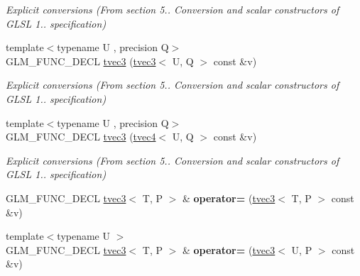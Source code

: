 \begin{DoxyCompactItemize}
\begin{DoxyCompactList}\small\item\em Explicit conversions (From section 5.. Conversion and scalar constructors of G\+L\+SL 1.. specification) \end{DoxyCompactList}\item 
{\footnotesize template$<$typename U , precision Q$>$ }\\G\+L\+M\+\_\+\+F\+U\+N\+C\+\_\+\+D\+E\+CL \hyperlink{structglm_1_1detail_1_1tvec3_a54b078bacee2ec2449d2739d98f20ca4}{tvec3} (\hyperlink{structglm_1_1detail_1_1tvec3}{tvec3}$<$ U, Q $>$ const \&v)\hypertarget{structglm_1_1detail_1_1tvec3_a54b078bacee2ec2449d2739d98f20ca4}{}\label{structglm_1_1detail_1_1tvec3_a54b078bacee2ec2449d2739d98f20ca4}

\begin{DoxyCompactList}\small\item\em Explicit conversions (From section 5.. Conversion and scalar constructors of G\+L\+SL 1.. specification) \end{DoxyCompactList}\item 
{\footnotesize template$<$typename U , precision Q$>$ }\\G\+L\+M\+\_\+\+F\+U\+N\+C\+\_\+\+D\+E\+CL \hyperlink{structglm_1_1detail_1_1tvec3_aee034f5d37843761ab03ce2c279a0435}{tvec3} (\hyperlink{structglm_1_1detail_1_1tvec4}{tvec4}$<$ U, Q $>$ const \&v)\hypertarget{structglm_1_1detail_1_1tvec3_aee034f5d37843761ab03ce2c279a0435}{}\label{structglm_1_1detail_1_1tvec3_aee034f5d37843761ab03ce2c279a0435}

\begin{DoxyCompactList}\small\item\em Explicit conversions (From section 5.. Conversion and scalar constructors of G\+L\+SL 1.. specification) \end{DoxyCompactList}\item 
G\+L\+M\+\_\+\+F\+U\+N\+C\+\_\+\+D\+E\+CL \hyperlink{structglm_1_1detail_1_1tvec3}{tvec3}$<$ T, P $>$ \& {\bfseries operator=} (\hyperlink{structglm_1_1detail_1_1tvec3}{tvec3}$<$ T, P $>$ const \&v)\hypertarget{structglm_1_1detail_1_1tvec3_a9f44bd2cac6579b51eab334829af1421}{}\label{structglm_1_1detail_1_1tvec3_a9f44bd2cac6579b51eab334829af1421}

\item 
{\footnotesize template$<$typename U $>$ }\\G\+L\+M\+\_\+\+F\+U\+N\+C\+\_\+\+D\+E\+CL \hyperlink{structglm_1_1detail_1_1tvec3}{tvec3}$<$ T, P $>$ \& {\bfseries operator=} (\hyperlink{structglm_1_1detail_1_1tvec3}{tvec3}$<$ U, P $>$ const \&v)\hypertarget{structglm_1_1detail_1_1tvec3_aa930edd4c5010f088ff8bf10d3a50378}{}\label{structglm_1_1detail_1_1tvec3_aa930edd4c5010f088ff8bf10d3a50378}


\end{DoxyCompactItemize}
